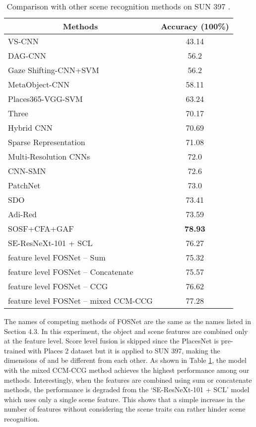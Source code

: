 \documentclass[journal,comsoc]{IEEEtran}
\begin{document}
\begin{table}[]
\centering
\caption{Comparison with other scene recognition methods on SUN 397 \cite{b33}.}
\begin{tabular}{lc}
\toprule
\multicolumn{1}{c}{Methods}           & Accuracy (100\%) \\
\midrule
VS-CNN \cite{b15}                     & 43.14            \\
DAG-CNN \cite{b10}                    & 56.2             \\
Gaze Shifting-CNN+SVM \cite{b12}      & 56.2             \\
MetaObject-CNN \cite{b14}             & 58.11            \\
Places365-VGG-SVM \cite{b20}          & 63.24            \\
Three \cite{b7}                       & 70.17            \\
Hybrid CNN \cite{b8}                  & 70.69            \\
Sparse Representation \cite{b17}      & 71.08            \\
Multi-Resolution CNNs \cite{b5}       & 72.0             \\
CNN-SMN \cite{b13}                    & 72.6             \\
PatchNet \cite{b16}                   & 73.0             \\
SDO \cite{b9}                         & 73.41            \\
Adi-Red \cite{b6}                     & 73.59            \\
SOSF+CFA+GAF \cite{b4}                & \textbf{78.93}   \\
SE-ResNeXt-101 + SCL                  & 76.27            \\
feature level FOSNet – Sum            & 75.32            \\
feature level FOSNet – Concatenate    & 75.57            \\
feature level FOSNet – CCG           & 76.62            \\
feature level FOSNet – mixed CCM-CCG & 77.28           \\
\bottomrule
\end{tabular}
\label{tab2}
\end{table}

The names of competing methods of FOSNet are the same as the names listed in Section 4.3. In this experiment, the object and scene features are combined only at the feature level. Score level fusion is skipped since the PlacesNet is pre-trained with Places 2 dataset but it is applied to SUN 397, making the dimensions of  and  be different from each other. As shown in Table \ref{tab2}, the model with the mixed CCM-CCG method achieves the highest performance among our methods. Interestingly, when the features are combined using sum or concatenate methods, the performance is degraded from the `SE-ResNeXt-101 + SCL' model which uses only a single scene feature. This shows that a simple increase in the number of features without considering the scene traits can rather hinder scene recognition.
\end{document}
